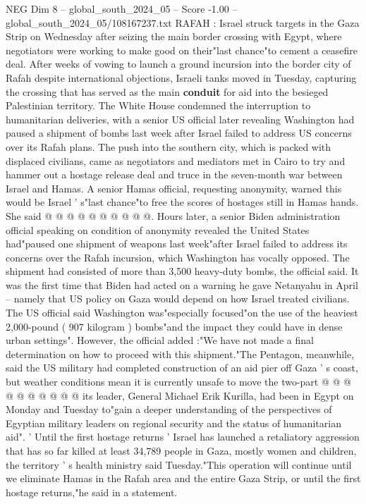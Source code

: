 \begin{textsample}{NEG Dim 8 – global\_south\_2024\_05 – Score -1.00 – global\_south\_2024\_05/108167237.txt}  \label{ex:f8_neg_104}
RAFAH : Israel struck targets in the Gaza Strip on Wednesday after seizing the main border crossing with Egypt, where negotiators were working to make good on their"last chance"to cement a ceasefire deal.
After weeks of vowing to launch a ground incursion into the border city of Rafah despite international objections, Israeli tanks moved in Tuesday, capturing the crossing that has served as the main \textbf{conduit} for aid into the besieged Palestinian territory.
The White House condemned the interruption to humanitarian deliveries, with a senior US official later revealing Washington had paused a shipment of bombs last week after Israel failed to address US concerns over its Rafah plans.
The push into the southern city, which is packed with displaced civilians, came as negotiators and mediators met in Cairo to try and hammer out a hostage release deal and truce in the seven-month war between Israel and Hamas.
A senior Hamas official, requesting anonymity, warned this would be Israel ' s"last chance"to free the scores of hostages still in Hamas hands.
She said @ @ @ @ @ @ @ @ @ @.
Hours later, a senior Biden administration official speaking on condition of anonymity revealed the United States had"paused one shipment of weapons last week"after Israel failed to address its concerns over the Rafah incursion, which Washington has vocally opposed.
The shipment had consisted of more than 3,500 heavy-duty bombs, the official said.
It was the first time that Biden had acted on a warning he gave Netanyahu in April -- namely that US policy on Gaza would depend on how Israel treated civilians.
The US official said Washington was"especially focused"on the use of the heaviest 2,000-pound ( 907 kilogram ) bombs"and the impact they could have in dense urban settings".
However, the official added :"We have not made a final determination on how to proceed with this shipment."The Pentagon, meanwhile, said the US military had completed construction of an aid pier off Gaza ' s coast, but weather conditions mean it is currently unsafe to move the two-part @ @ @ @ @ @ @ @ @ @ its leader, General Michael Erik Kurilla, had been in Egypt on Monday and Tuesday to"gain a deeper understanding of the perspectives of Egyptian military leaders on regional security and the status of humanitarian aid". ' Until the first hostage returns ' Israel has launched a retaliatory aggression that has so far killed at least 34,789 people in Gaza, mostly women and children, the territory ' s health ministry said Tuesday."This operation will continue until we eliminate Hamas in the Rafah area and the entire Gaza Strip, or until the first hostage returns,"he said in a statement.

\end{textsample}
